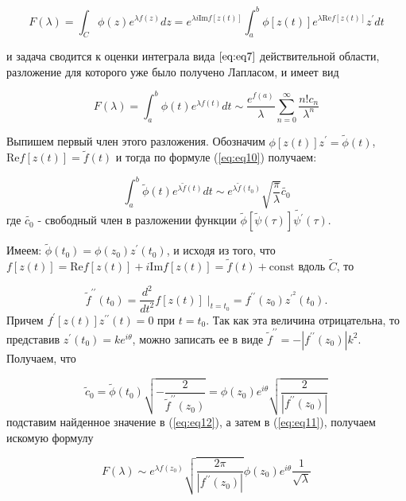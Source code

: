 \documentclass[14pt]{extarticle}
\renewcommand{\Re}{\mathrm{Re}}
\renewcommand{\Im}{\mathrm{Im}}
\newcommand{\const}{\mathrm{const}}
\begin{document}
\begin{equation}\label{eq:eq11}
F(\lambda) = \int_{C}^{}\phi(z) e^{\lambda f(z)}dz=e^{\lambda i \Im f[z(t)]}\int_{a}^{b}\phi[z(t)]e^{\lambda \Re f[z(t)]}z^{\prime} dt
\end{equation}

и задача сводится к оценки интеграла вида $\ref{eq:eq7}$ действительной области, разложение для которого уже было получено Лапласом, и имеет вид\cite{Lavrentyev}

$$
F(\lambda) = \int_{a}^{b}\phi(t)e^{\lambda f(t)}dt \sim \frac{e^{f(a)}}{\lambda}\sum_{n=0}^{\infty}\frac{n! c_n}{\lambda^n}
$$
  
Выпишем первый член этого разложения. Обозначим $\phi[z(t)]z^\prime = \widetilde{\phi}(t)$, $\Re f[z(t)] = \widetilde{f}(t)$ и тогда по формуле (\ref{eq:eq10}) получаем:

\begin{equation}\label{eq:eq12}
\int_{a}^{b} \widetilde{\phi}(t) e^{\lambda \widetilde{f}(t)}dt \sim e^{\lambda \widetilde{f}(t_0)} \sqrt{\frac{\pi}{\lambda}} \widetilde{c_0}
\end{equation}
где $\widetilde{c_0}$ - свободный член в разложении функции $\widetilde{\phi}[\widetilde{\psi}(\tau)]\widetilde{\psi^\prime}(\tau)$.

Имеем: $\widetilde{\phi}(t_0) = \phi(z_0) z^\prime (t_0)$, и исходя из того, что $f[z(t)] = \Re f[z(t)]+ i \Im f[z(t)] = \widetilde{f}(t)+\const$ вдоль $\widetilde{C}$, то

\begin{equation}\nonumber
\widetilde{f}^{\prime\prime} (t_0) = \frac{d^2}{d t^2} f[z(t)]\;|_{t=t_0} = f^{\prime\prime} (z_0) z^{\prime^2} (t_0).
\end{equation}
Причем $f^\prime[z(t)] z^{\prime \prime} (t) = 0$ при $t=t_0$. Так как эта величина отрицательна, то представив $z^\prime (t_0) = k e^{i \theta}$, можно записать ее в виде $\widetilde{f}^{\prime\prime}=-|f^{\prime\prime}(z_0)| k^2$. Получаем, что 

\begin{equation}\nonumber
\widetilde{c}_0=\widetilde{\phi}(t_0) \sqrt{-\frac{2}{\widetilde{f}^{\prime\prime}(z_0)}}= \phi (z_0) e^{i \theta} \sqrt{\frac{2}{|f^{\prime\prime}(z_0)|}}
\end{equation}
подставим найденное значение в (\ref{eq:eq12}), а затем в (\ref{eq:eq11}), получаем искомую формулу

\begin{equation}\label{eq:eq13}
F(\lambda) \sim e^{\lambda f (z_0)}\sqrt{\frac{2\pi}{|f^{\prime \prime} (z_0)|}} \phi(z_0) e^{i \theta} \frac{1}{\sqrt{\lambda}}
\end{equation}
\end{document}
